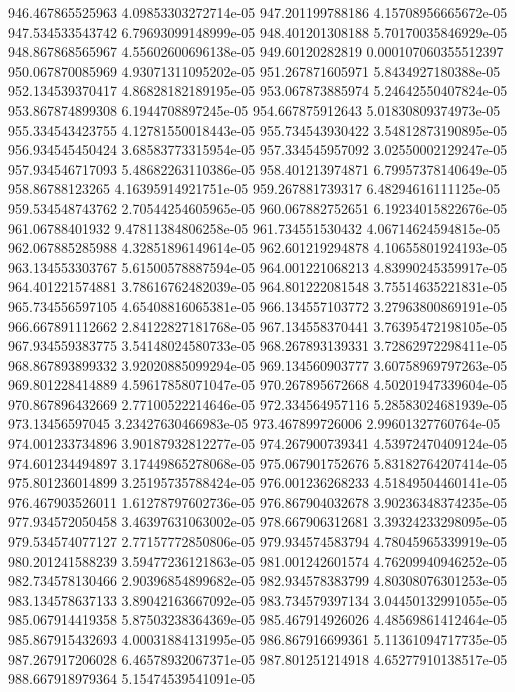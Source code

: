 {946.467865525963 4.09853303272714e-05
947.201199788186 4.15708956665672e-05
947.534533543742 6.79693099148999e-05
948.401201308188 5.70170035846929e-05
948.867868565967 4.55602600696138e-05
949.60120282819 0.000107060355512397
950.067870085969 4.93071311095202e-05
951.267871605971 5.8434927180388e-05
952.134539370417 4.86828182189195e-05
953.067873885974 5.24642550407824e-05
953.867874899308 6.1944708897245e-05
954.667875912643 5.01830809374973e-05
955.334543423755 4.12781550018443e-05
955.734543930422 3.54812873190895e-05
956.934545450424 3.68583773315954e-05
957.334545957092 3.02550002129247e-05
957.934546717093 5.48682263110386e-05
958.401213974871 6.79957378140649e-05
958.86788123265 4.16395914921751e-05
959.267881739317 6.48294616111125e-05
959.534548743762 2.70544254605965e-05
960.067882752651 6.19234015822676e-05
961.06788401932 9.47811384806258e-05
961.734551530432 4.06714624594815e-05
962.067885285988 4.32851896149614e-05
962.601219294878 4.10655801924193e-05
963.134553303767 5.61500578887594e-05
964.001221068213 4.83990245359917e-05
964.401221574881 3.78616762482039e-05
964.801222081548 3.75514635221831e-05
965.734556597105 4.65408816065381e-05
966.134557103772 3.27963800869191e-05
966.667891112662 2.84122827181768e-05
967.134558370441 3.76395472198105e-05
967.934559383775 3.54148024580733e-05
968.267893139331 3.72862972298411e-05
968.867893899332 3.92020885099294e-05
969.134560903777 3.60758969797263e-05
969.801228414889 4.59617858071047e-05
970.267895672668 4.50201947339604e-05
970.867896432669 2.77100522214646e-05
972.334564957116 5.28583024681939e-05
973.13456597045 3.23427630466983e-05
973.467899726006 2.99601327760764e-05
974.001233734896 3.90187932812277e-05
974.267900739341 4.53972470409124e-05
974.601234494897 3.17449865278068e-05
975.067901752676 5.83182764207414e-05
975.801236014899 3.25195735788424e-05
976.001236268233 4.51849504460141e-05
976.467903526011 1.61278797602736e-05
976.867904032678 3.90236348374235e-05
977.934572050458 3.46397631063002e-05
978.667906312681 3.39324233298095e-05
979.534574077127 2.77157772850806e-05
979.934574583794 4.78045965339919e-05
980.201241588239 3.59477236121863e-05
981.001242601574 4.76209940946252e-05
982.734578130466 2.90396854899682e-05
982.934578383799 4.80308076301253e-05
983.134578637133 3.89042163667092e-05
983.734579397134 3.04450132991055e-05
985.067914419358 5.87503238364369e-05
985.467914926026 4.48569861412464e-05
985.867915432693 4.00031884131995e-05
986.867916699361 5.11361094717735e-05
987.267917206028 6.46578932067371e-05
987.801251214918 4.65277910138517e-05
988.667918979364 5.15474539541091e-05
}
